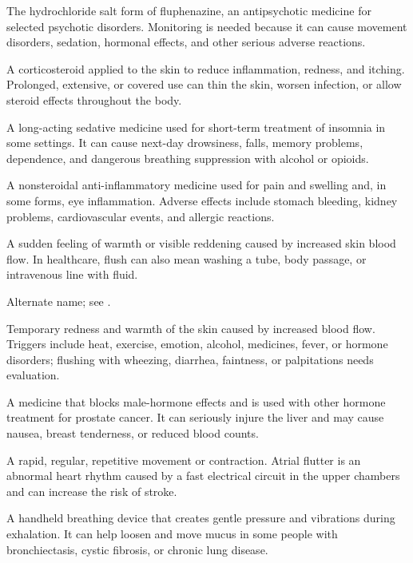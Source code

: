  The hydrochloride salt form of fluphenazine, an antipsychotic medicine for selected psychotic disorders. Monitoring is needed because it can cause movement disorders, sedation, hormonal effects, and other serious adverse reactions.

 A corticosteroid applied to the skin to reduce inflammation, redness, and itching. Prolonged, extensive, or covered use can thin the skin, worsen infection, or allow steroid effects throughout the body.

 A long-acting sedative medicine used for short-term treatment of insomnia in some settings. It can cause next-day drowsiness, falls, memory problems, dependence, and dangerous breathing suppression with alcohol or opioids.

 A nonsteroidal anti-inflammatory medicine used for pain and swelling and, in some forms, eye inflammation. Adverse effects include stomach bleeding, kidney problems, cardiovascular events, and allergic reactions.

 A sudden feeling of warmth or visible reddening caused by increased skin blood flow. In healthcare, flush can also mean washing a tube, body passage, or intravenous line with fluid.

 Alternate name; see .

 Temporary redness and warmth of the skin caused by increased blood flow. Triggers include heat, exercise, emotion, alcohol, medicines, fever, or hormone disorders; flushing with wheezing, diarrhea, faintness, or palpitations needs evaluation.

 A medicine that blocks male-hormone effects and is used with other hormone treatment for prostate cancer. It can seriously injure the liver and may cause nausea, breast tenderness, or reduced blood counts.

 A rapid, regular, repetitive movement or contraction. Atrial flutter is an abnormal heart rhythm caused by a fast electrical circuit in the upper chambers and can increase the risk of stroke.

 A handheld breathing device that creates gentle pressure and vibrations during exhalation. It can help loosen and move mucus in some people with bronchiectasis, cystic fibrosis, or chronic lung disease.

